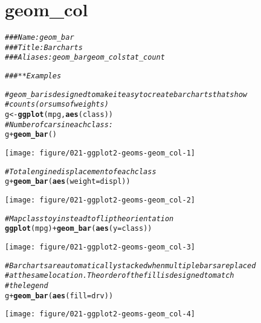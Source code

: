 \documentclass[a4paper,titlepage]{tufte-handout}\usepackage[]{graphicx}\usepackage[]{xcolor}
\makeatletter
\def\maxwidth{ %
  \ifdim\Gin@nat@width>\linewidth
    \linewidth
  \else
    \Gin@nat@width
  \fi
}
\newcommand{\hlcom}[1]{\textcolor[rgb]{0.678,0.584,0.686}{\textit{#1}}}%
\newcommand{\hlopt}[1]{\textcolor[rgb]{0,0,0}{#1}}%
\newcommand{\hldef}[1]{\textcolor[rgb]{0.345,0.345,0.345}{#1}}%
\newcommand{\hlkwb}[1]{\textcolor[rgb]{0.69,0.353,0.396}{#1}}%
\newcommand{\hlkwc}[1]{\textcolor[rgb]{0.333,0.667,0.333}{#1}}%
\newcommand{\hlkwd}[1]{\textcolor[rgb]{0.737,0.353,0.396}{\textbf{#1}}}%
\newenvironment{kframe}{%
 \def\at@end@of@kframe{}%
 \ifinner\ifhmode%
  \def\at@end@of@kframe{\end{minipage}}%
  \begin{minipage}{\columnwidth}%
 \fi\fi%
 \def\FrameCommand##1{\hskip\@totalleftmargin \hskip-\fboxsep
 \colorbox{shadecolor}{##1}\hskip-\fboxsep
     \hskip-\linewidth \hskip-\@totalleftmargin \hskip\columnwidth}%
 \MakeFramed {\advance\hsize-\width
   \@totalleftmargin\z@ \linewidth\hsize
   \@setminipage}}%
 {\par\unskip\endMakeFramed%
 \at@end@of@kframe}
\newenvironment{knitrout}{}{} %
\makeatother
\begin{document}
\section{geom\_col}

\begin{knitrout}
\color{fgcolor}\begin{kframe}
\begin{alltt}
\hlcom{### Name: geom_bar}
\hlcom{### Title: Bar charts}
\hlcom{### Aliases: geom_bar geom_col stat_count}

\hlcom{### ** Examples}

\hlcom{# geom_bar is designed to make it easy to create bar charts that show}
\hlcom{# counts (or sums of weights)}
\hldef{g} \hlkwb{<-} \hlkwd{ggplot}\hldef{(mpg,} \hlkwd{aes}\hldef{(class))}
\hlcom{# Number of cars in each class:}
\hldef{g} \hlopt{+} \hlkwd{geom_bar}\hldef{()}
\end{alltt}
\end{kframe}
\texttt{[image: figure/021-ggplot2-geoms-geom\_col-1]} 
\begin{kframe}\begin{alltt}
\hlcom{# Total engine displacement of each class}
\hldef{g} \hlopt{+} \hlkwd{geom_bar}\hldef{(}\hlkwd{aes}\hldef{(}\hlkwc{weight} \hldef{= displ))}
\end{alltt}
\end{kframe}
\texttt{[image: figure/021-ggplot2-geoms-geom\_col-2]} 
\begin{kframe}\begin{alltt}
\hlcom{# Map class to y instead to flip the orientation}
\hlkwd{ggplot}\hldef{(mpg)} \hlopt{+} \hlkwd{geom_bar}\hldef{(}\hlkwd{aes}\hldef{(}\hlkwc{y} \hldef{= class))}
\end{alltt}
\end{kframe}
\texttt{[image: figure/021-ggplot2-geoms-geom\_col-3]} 
\begin{kframe}\begin{alltt}
\hlcom{# Bar charts are automatically stacked when multiple bars are placed}
\hlcom{# at the same location. The order of the fill is designed to match}
\hlcom{# the legend}
\hldef{g} \hlopt{+} \hlkwd{geom_bar}\hldef{(}\hlkwd{aes}\hldef{(}\hlkwc{fill} \hldef{= drv))}
\end{alltt}
\end{kframe}
\texttt{[image: figure/021-ggplot2-geoms-geom\_col-4]} 
\begin{kframe}\begin{alltt}

\end{alltt}
\end{kframe}
\end{knitrout}
\end{document}
